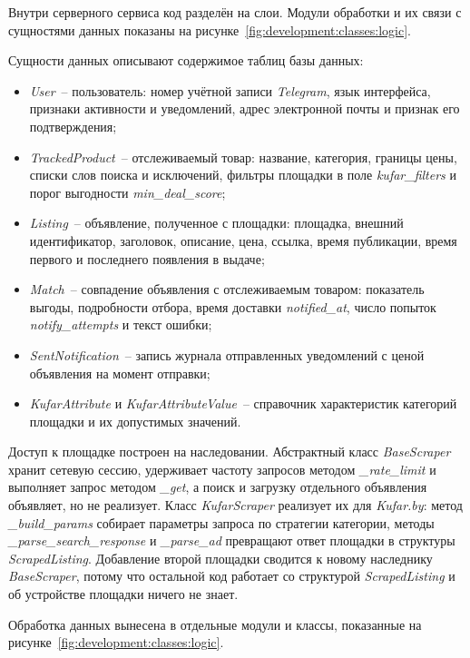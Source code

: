Внутри серверного сервиса код разделён на слои. Модули обработки и их связи с сущностями данных показаны на рисунке~\ref{fig:development:classes:logic}.

Сущности данных описывают содержимое таблиц базы данных:
\begin{itemize}
	\item \textit{User}~-- пользователь: номер учётной записи \textit{Telegram}, язык интерфейса, признаки активности и уведомлений, адрес электронной почты и признак его подтверждения;
	\item \textit{TrackedProduct}~-- отслеживаемый товар: название, категория, границы цены, списки слов поиска и исключений, фильтры площадки в поле \textit{kufar\_filters} и порог выгодности \textit{min\_deal\_score};
	\item \textit{Listing}~-- объявление, полученное с площадки: площадка, внешний идентификатор, заголовок, описание, цена, ссылка, время публикации, время первого и последнего появления в выдаче;
	\item \textit{Match}~-- совпадение объявления с отслеживаемым товаром: показатель выгоды, подробности отбора, время доставки \textit{notified\_at}, число попыток \textit{notify\_attempts} и текст ошибки;
	\item \textit{SentNotification}~-- запись журнала отправленных уведомлений с ценой объявления на момент отправки;
	\item \textit{KufarAttribute} и \textit{KufarAttributeValue}~-- справочник характеристик категорий площадки и их допустимых значений.
\end{itemize}

Доступ к площадке построен на наследовании. Абстрактный класс \textit{BaseScraper} хранит сетевую сессию, удерживает частоту запросов методом \textit{\_rate\_limit} и выполняет запрос методом \textit{\_get}, а поиск и загрузку отдельного объявления объявляет, но не реализует. Класс \textit{KufarScraper} реализует их для \textit{Kufar.by}: метод \textit{\_build\_params} собирает параметры запроса по стратегии категории, методы \textit{\_parse\_search\_response} и \textit{\_parse\_ad} превращают ответ площадки в структуры \textit{ScrapedListing}. Добавление второй площадки сводится к новому наследнику \textit{BaseScraper}, потому что остальной код работает со структурой \textit{ScrapedListing} и об устройстве площадки ничего не знает.

Обработка данных вынесена в отдельные модули и классы, показанные на рисунке~\ref{fig:development:classes:logic}.

